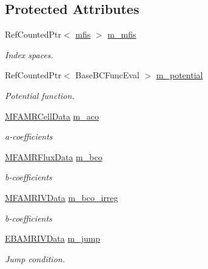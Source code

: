 \subsection*{Protected Attributes}
\begin{DoxyCompactItemize}
\item 
Ref\+Counted\+Ptr$<$ \hyperlink{classmfis}{mfis} $>$ \hyperlink{classnwomfconductivityopfactory_a175cb9eafc8c385f1d4ee9d284cbee38}{m\+\_\+mfis}
\begin{DoxyCompactList}\small\item\em Index spaces. \end{DoxyCompactList}\item 
Ref\+Counted\+Ptr$<$ Base\+B\+C\+Func\+Eval $>$ \hyperlink{classnwomfconductivityopfactory_aa49cb695d778559971ee983223628782}{m\+\_\+potential}
\begin{DoxyCompactList}\small\item\em Potential function. \end{DoxyCompactList}\item 
\hyperlink{type__definitions_8H_aced885351d40daa466564acbee4042d3}{M\+F\+A\+M\+R\+Cell\+Data} \hyperlink{classnwomfconductivityopfactory_a429aa1cb44bbec71e40aff77a8303957}{m\+\_\+aco}
\begin{DoxyCompactList}\small\item\em a-\/coefficients \end{DoxyCompactList}\item 
\hyperlink{type__definitions_8H_a4033d82364b7e6655b58257749d7881f}{M\+F\+A\+M\+R\+Flux\+Data} \hyperlink{classnwomfconductivityopfactory_a7db2a52626f9d6ee0ac3763decbbfc15}{m\+\_\+bco}
\begin{DoxyCompactList}\small\item\em b-\/coefficients \end{DoxyCompactList}\item 
\hyperlink{type__definitions_8H_a559707b00625e419df1a59d9501220de}{M\+F\+A\+M\+R\+I\+V\+Data} \hyperlink{classnwomfconductivityopfactory_a052d67e45ad98de7c8e39d5ddad7fbd2}{m\+\_\+bco\+\_\+irreg}
\begin{DoxyCompactList}\small\item\em b-\/coefficients \end{DoxyCompactList}\item 
\hyperlink{type__definitions_8H_a6b8fa905d55cbb491b52180386f0e0c1}{E\+B\+A\+M\+R\+I\+V\+Data} \hyperlink{classnwomfconductivityopfactory_ab93c6115032e5884948220ed7fe2f7c7}{m\+\_\+jump}
\begin{DoxyCompactList}\small\item\em Jump condition. \end{DoxyCompactList}\item 

\end{DoxyCompactItemize}
